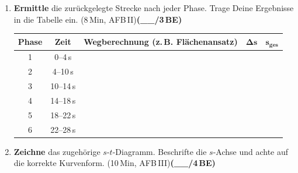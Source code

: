 \documentclass[11pt,a4paper]{article}
\newcommand{\BEZEIT}[3]{%
\hfill{\small\color{zeitgray}(#1\,Min, AFB\,#2)}\quad\textbf{(\_\_/#3\,BE)}%
}
\begin{document}
\newpage

\begin{enumerate}
\item[c)] \textbf{Ermittle} die zurückgelegte Strecke nach jeder Phase. Trage Deine Ergebnisse in die Tabelle ein. \BEZEIT{8}{II}{3}

\vspace{0.2cm}

\begin{center}
\begin{tabularx}{0.95\textwidth}{|c|c|X|c|c|}
\hline
\textbf{Phase} & \textbf{Zeit} & \textbf{Wegberechnung} {\footnotesize(z.\,B. Flächenansatz)} & $\boldsymbol{\Delta s}$ & $\boldsymbol{s_{\textbf{ges}}}$ \\
\hline
1 & 0--4\,s & & & \\[1.05cm]
\hline
2 & 4--10\,s & & & \\[1.05cm]
\hline
3 & 10--14\,s & & & \\[1.05cm]
\hline
4 & 14--18\,s & & & \\[1.05cm]
\hline
5 & 18--22\,s & & & \\[1.05cm]
\hline
6 & 22--28\,s & & & \\[1.05cm]
\hline
\end{tabularx}
\end{center}

\vspace{0.3cm}

\item[d)] \textbf{Zeichne} das zugehörige $s$-$t$-Diagramm. Beschrifte die $s$-Achse und achte auf die korrekte Kurvenform. \BEZEIT{10}{III}{4}\nopagebreak

\vspace{0.2cm}\nopagebreak


\end{enumerate}
\end{document}
